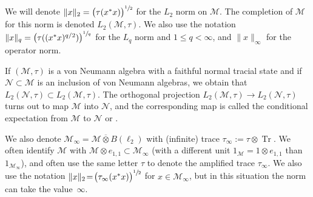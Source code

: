 \documentclass[10pt]{amsart}
\theoremstyle{plain}
\theoremstyle{definition}
\newcommand{\cM}{\mathcal{M}}
\newcommand{\cN}{\mathcal{N}}
\DeclareMathOperator{\Tr}{Tr}
\numberwithin{equation}{section}
\begin{document}
We will denote $\|x\|_2 = \big(\tau(x^*x)\big)^{\sfrac 1 2}$ for the $L_2$ norm on $\cM$. The completion of $\cM$ for this norm is denoted $L_2(\cM,\tau)$. We also use the notation $\|x\|_q = \big(\tau( (x^*x)^{q/2})\big)^{\sfrac 1 q}$ for the $L_q$ norm and $1\leq q<\infty$, and $\|x\|_\infty$ for the operator norm.

If $(\cM,\tau)$ is a von Neumann algebra with a faithful normal tracial state and if $\cN \subset\cM$ is an inclusion of von Neumann algebras, we obtain that $L_2(\cN,\tau)\subset L_2(\cM,\tau)$. The orthogonal projection $L_2(\cM,\tau) \to L_2(\cN,\tau)$ turns out to map $\cM$ into $\cN$, and the corresponding map is called the conditional expectation from $\cM$ to $\cN$ \cite[\S 9]{AnantharamanPopa} or \cite[Prop.\,V.2.36]{MR1873025}.

We also denote $\cM_\infty = \cM \overline{\otimes} B(\ell_2)$ with (infinite) trace $\tau_\infty:=\tau \otimes \Tr$. We often identify $\cM$ with $\cM \otimes e_{1,1} \subset \cM_\infty$ (with a different unit $1_\cM = 1 \otimes e_{1,1}$ than $1_{\cM_\infty}$), and often use the same letter $\tau$ to denote the amplified trace $\tau_\infty$. We also use the notation $\|x\|_2 \!=\! \big(\tau_\infty(x^*x)\big)^{\sfrac 1 2}$ for $x \!\in\! \cM_\infty$, but in this situation the norm can take the value~$\infty$.
\setcounter{subsection}{2}
\end{document}
